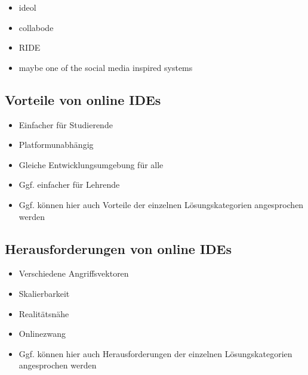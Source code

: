 \begin{itemize}
    \item ideol
    \item collabode
    \item RIDE
    \item maybe one of the social media inspired systems
\end{itemize}

\subsection{Vorteile von online IDEs} \label{advantages-online-ides}

\begin{itemize}
    \item Einfacher für Studierende
    \item Platformunabhängig
    \item Gleiche Entwicklungsumgebung für alle
    \item Ggf. einfacher für Lehrende
    \item Ggf. können hier auch Vorteile der einzelnen Lösungskategorien angesprochen werden
\end{itemize}

\subsection{Herausforderungen von online IDEs} \label{challenges-online-ides}

\begin{itemize}
    \item Verschiedene Angriffsvektoren
    \item Skalierbarkeit
    \item Realitätsnähe
    \item Onlinezwang
    \item Ggf. können hier auch Herausforderungen der einzelnen Lösungskategorien angesprochen werden
\end{itemize}


